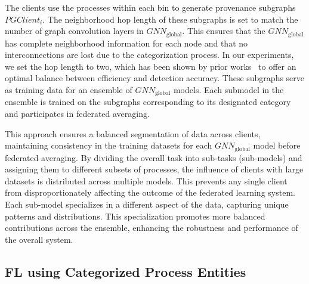 The clients use the processes within each bin to generate provenance subgraphs \( PGClient_{i} \). The neighborhood hop length of these subgraphs is set to match the number of graph convolution layers in \( {GNN}_{\text{global}} \). This ensures that the \({GNN}_{\text{global}}\) has complete neighborhood information for each node and that no interconnections are lost due to the categorization process. In our experiments, we set the hop length to two, which has been shown by prior works~\cite{wang2022threatrace,flash2024} to offer an optimal balance between efficiency and detection accuracy. These subgraphs serve as training data for an ensemble of \({GNN}_{\text{global}}\) models. Each submodel in the ensemble is trained on the subgraphs corresponding to its designated category and participates in federated averaging. 

This approach ensures a balanced segmentation of data across clients, maintaining consistency in the training datasets for each \({GNN}_{\text{global}}\) model before federated averaging. By dividing the overall task into sub-tasks (sub-models) and assigning them to different subsets of processes, the influence of clients with large datasets is distributed across multiple models. This prevents any single client from disproportionately affecting the outcome of the federated learning system. Each sub-model specializes in a different aspect of the data, capturing unique patterns and distributions. This specialization promotes more balanced contributions across the ensemble, enhancing the robustness and performance of the overall system.




\subsection{FL using Categorized Process Entities}
\label{sys:fpgl}





